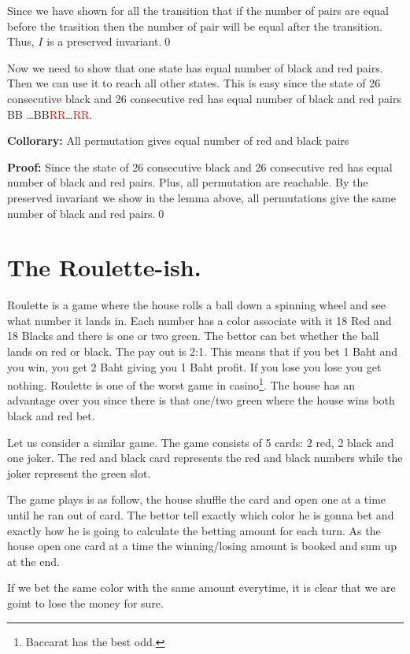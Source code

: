 \documentclass[a4paper, 12pt]{article}
\renewcommand{\proof}{\vspace{0.5em}\noindent\textbf{Proof:} }
\newcommand{\collorary}{\vspace{1em}\noindent\textbf{Collorary:} }
\newcommand{\qedd}{\qed\newline}
\newcommand{\R}{\textcolor{red}{R}}
\theoremstyle{examplestyle}
\begin{document}
\begin{multicols}{2}
\begin{enumerate}
\end{enumerate}

Since we have shown for all the transition that if the number of pairs are equal before the trasition then the number of pair will be equal after the transition. Thus, $I$ is a preserved invariant.\qedd

Now we need to show that one state has equal number of black and red pairs. Then we can use it to reach all other states. This is easy since the state of 26 consecutive black and 26 consecutive red has equal number of black and red pairs BB \ldots BB\R \R\ldots \R \R.

\collorary All permutation gives equal number of red and black pairs

\proof Since the state of 26 consecutive black and 26 consecutive red has equal number of black and red pairs. Plus, all permutation are reachable. By the preserved invariant we show in the lemma above, all permutations give the same number of black and red pairs.\qedd

\section*{The Roulette-ish.}

Roulette is a game where the house rolls a ball down a spinning wheel and see what number it lands in. Each number has a color associate with it 18 Red and 18 Blacks and there is one or two green. The bettor can bet whether the ball lands on red or black. The pay out is 2:1. This means that if you bet 1 Baht and you win, you get 2 Baht giving you 1 Baht profit. If you lose you lose you get nothing. Roulette is one of the worst game in casino\footnote{Baccarat has the best odd.}. The house has an advantage over you since there is that one/two green where the house wins both black and red bet.

Let us consider a similar game. The game consists of 5 cards: 2 red, 2 black and one joker. The red and black card represents the red and black numbers while the joker represent the green slot.

The game plays is as follow, the house shuffle the card and open one at a time until he ran out of card. The bettor tell exactly which color he is gonna bet and exactly how he is going to calculate the betting amount for each turn. As the house open one card at a time the winning/losing amount is booked and sum up at the end.

If we bet the same color with the same amount everytime, it is clear that we are goint to lose the money for sure.


\end{multicols}
\end{document}
